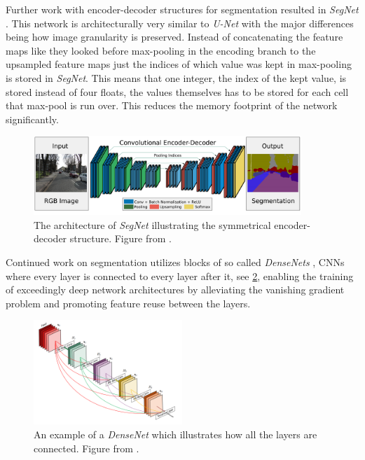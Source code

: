 \documentclass{kththesis}
\newcommand{\bibentry}[1]{\parencite{#1}}
\begin{document}
Further work with encoder-decoder structures for segmentation resulted in \emph{SegNet}
\bibentry{badrinarayanan2015segnet}. This network is architecturally very
similar to \textit{U-Net} with the  major differences being how image
granularity is preserved. Instead of concatenating the feature maps like they
looked before max-pooling in the encoding branch to the upsampled feature maps
just the indices of which value was kept in max-pooling is stored in
\textit{SegNet}. This means that one integer, the index of the kept value, is
stored instead of four floats, the values themselves has to be stored for
each cell that max-pool is run over. This reduces the memory footprint of the
network significantly.

\begin{figure}[h]
  \centering
  \includegraphics[width=0.9\textwidth]{SegNet}
  \caption{The architecture of \textit{SegNet} illustrating the symmetrical
    encoder-decoder structure. Figure from \textcite[]{badrinarayanan2015segnet}.}
  \label{fig:SegNet}
  \end{figure}

Continued work on segmentation utilizes blocks of so called \emph{DenseNets}
\bibentry{huang2017densely}, CNNs where every layer is connected to every layer
after it, see \cref{fig:DenseNet}, enabling the training of exceedingly deep network architectures by
alleviating the vanishing gradient problem and promoting feature reuse between
the layers.

\begin{figure}[h]
  \centering
  \includegraphics[width=0.5\textwidth]{dense}
  \caption{An example of a \textit{DenseNet} which illustrates how all the
    layers are connected. Figure from \textcite[]{huang2017densely}.}
  \label{fig:DenseNet}
  \end{figure}
\end{document}
